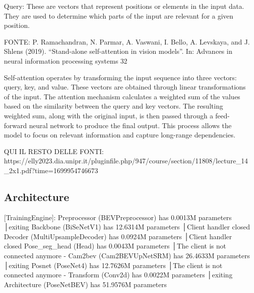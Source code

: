 Query: These are vectors that represent positions or elements in the input
data. They are used to determine which parts of the input are relevant for a
given position.

FONTE: 
P. Ramachandran, N. Parmar, A. Vaswani, I. Bello, A. Levskaya, and J. Shlens (2019). “Stand-alone self-attention in vision models”. In:
Advances in neural information processing systems 32

Self-attention operates by transforming the input sequence into three vectors:
query, key, and value.
These vectors are obtained through linear transformations of the input. The
attention mechanism calculates a weighted sum of the values based on the
similarity between the query and key vectors.
The resulting weighted sum, along with the original input, is then passed
through a feed-forward neural network to produce the final output.
This process allows the model to focus on relevant information and capture
long-range dependencies.


QUI IL RESTO DELLE FONTI:
https://elly2023.dia.unipr.it/pluginfile.php/947/course/section/11808/lecture_14_2x1.pdf?time=1699954746673


\subsection{Architecture}

[TrainingEngine]: Preprocessor (BEVPreprocessor) has 0.0013M parameters                                                                                             │exiting
                  Backbone (BiSeNetV1) has 12.6314M parameters                                                                                                      │Client handler closed
                  Decoder (MultiUpsampleDecoder) has 0.0924M parameters                                                                                             │Client handler closed
                  Pose_seg_head (Head) has 0.0043M parameters                                                                                                       │The client is not connected anymore - 
                  Cam2bev (Cam2BEVUpNetSRM) has 26.4633M parameters                                                                                                 │exiting
                  Posnet (PoseNet4) has 12.7626M parameters                                                                                                         │The client is not connected anymore - 
                  Transform (Conv2d) has 0.0022M parameters                                                                                                         │exiting
                  Architecture (PoseNetBEV) has 51.9576M parameters

